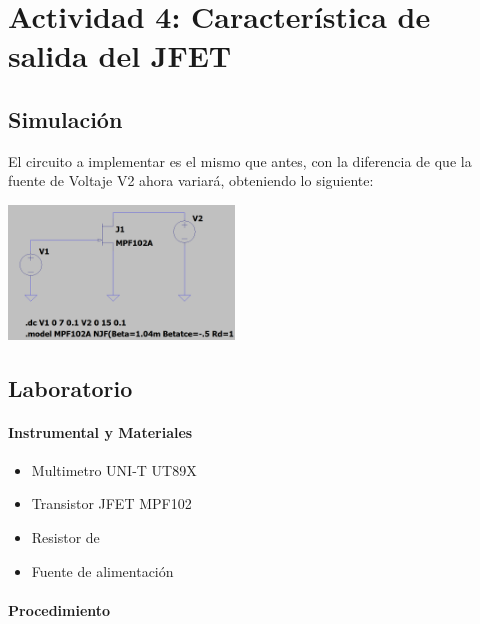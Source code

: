 \newpage

\section{Actividad 4: Característica de salida del JFET}

\subsection{Simulación}

El circuito a implementar es el mismo que antes, con la diferencia de que la fuente de Voltaje V2 ahora variará, obteniendo lo siguiente:

\includegraphics[width=6cm]{./imagenes/Circ4.png}

\subsection{Laboratorio}

\paragraph{Instrumental y Materiales}
\begin{itemize}
    \item Multimetro UNI-T UT89X
    \item Transistor JFET MPF102
    \item Resistor de
    \item Fuente de alimentación
\end{itemize}

\paragraph{Procedimiento}


